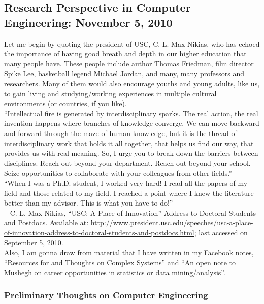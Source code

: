 \subsection{\hspace{0.1in} Research Perspective in Computer Engineering: November 5, 2010}
\label{computerengrresearch}

Let me begin by quoting the president of USC, C. L. Max Nikias, who has echoed the importance of having good breath and depth in our higher education that many people have. These people include author Thomas Friedman, film director Spike Lee, basketball legend Michael Jordan, and many, many professors and researchers. Many of them would also encourage youths and young adults, like us, to gain living and studying/working experiences in multiple cultural environments (or countries, if you like).  \\

``Intellectual fire is generated by interdisciplinary sparks. The real action, the real invention happens where branches of knowledge converge. We can move backward and forward through the maze of human knowledge, but it is the thread of interdisciplinary work that holds it all together, that helps us find our way, that provides us with real meaning. So, I urge you to break down the barriers between disciplines. Reach out beyond your department. Reach out beyond your school. Seize opportunities to collaborate with your colleagues from other fields.'' \\
``When I was a Ph.D. student, I worked very hard! I read all the papers of my field and those related to my field. I reached a point where I knew the literature better than my advisor. This is what you have to do!'' \\
-- C. L. Max Nikias, ``USC: A Place of Innovation'' Address to Doctoral Students and Postdocs. Available at: \url{http://www.president.usc.edu/speeches/usc-a-place-of-innovation-address-to-doctoral-students-and-postdocs.html}; last accessed on September 5, 2010. \\
  
Also, I am gonna draw from material that I have written in my Facebook notes, ``Resources for and Thoughts on Complex Systems'' and ``An open note to Mushegh on career opportunities in statistics or data mining/analysis''. \\


\subsubsection{\hspace{0.1in} Preliminary Thoughts on Computer Engineering}
\label{computerengpreliminarythoughts}
  
